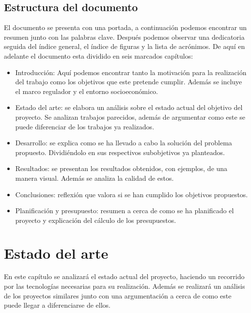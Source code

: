 \documentclass[12pt]{report} %
\begin{document}
	\section{Estructura del documento}
	El documento se presenta con una portada, a continuación podemos encontrar un resumen junto con las palabras clave. Después podemos
	observar una dedicatoria seguida del índice general, el índice de figuras y la lista de acrónimos. De aquí en adelante el documento
	esta dividido en seis marcados capítulos:
	\begin{itemize}
		\item Introducción: Aquí podemos encontrar tanto la motivación para la realización del trabajo como los objetivos que este pretende cumplir. Además se incluye el marco regulador y el entorno socioeconómico. 
		\item Estado del arte: se elabora un análisis sobre el estado actual del objetivo del proyecto. Se analizan trabajos parecidos, además de argumentar como este se puede diferenciar de los trabajos ya realizados.
		\item Desarrollo: se explica como se ha llevado a cabo la solución del problema propuesto. Dividiéndolo en sus respectivos subobjetivos ya planteados.
		\item Resultados: se presentan los resultados obtenidos, con ejemplos, de una manera visual. Además se analiza la calidad de estos.
		\item Conclusiones: reflexión que valora si se han cumplido los objetivos propuestos.
		\item Planificación y presupuesto: resumen a cerca de como se ha planificado el proyecto y explicación del cálculo de los presupuestos. 
	\end{itemize}


\chapter{Estado del arte}
	En este capítulo se analizará el estado actual del proyecto, haciendo un recorrido por las tecnologías necesarias para su realización.
	Además se realizará un análisis de los proyectos similares junto con una argumentación a cerca de como este puede llegar a diferenciarse de ellos.
\end{document}
